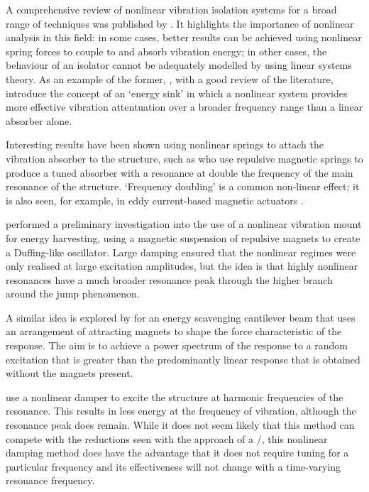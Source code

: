 \documentclass[11pt,a4paper]{memoir}
\begin{document}
A comprehensive review of nonlinear vibration isolation systems for a broad range of techniques was published by \textcite{ibrahim2008}.
It highlights the importance of nonlinear analysis in this field: in some cases, better results can be achieved using nonlinear spring forces to couple to and absorb vibration energy; in other cases, the behaviour of an isolator cannot be adequately modelled by using linear systems theory.
As an example of the former, \textcite{starosvetsky2008}, with a good review of the literature, introduce the concept of an `energy sink' in which a nonlinear system provides more effective vibration attentuation over a broader frequency range than a linear absorber alone.

Interesting results have been shown using nonlinear springs to attach the vibration absorber to the structure, such as \textcite{jo2008} who use repulsive magnetic springs to produce a tuned absorber with a resonance at double the frequency of the main resonance of the structure.
`Frequency doubling' is a common non-linear effect; it is also seen, for example, in eddy current-based magnetic actuators \cite{sodano2008-dsmc}.

\textcite{mann2008} performed a preliminary investigation into the use of a nonlinear vibration mount for energy harvesting, using a magnetic suspension of repulsive magnets to create a Duffing-like oscillator.
Large damping ensured that the nonlinear regimes were only realised at large excitation amplitudes, but the idea is that highly nonlinear resonances have a much broader resonance peak through the higher branch around the jump phenomenon.

A similar idea is explored by \textcite{shahruz2008} for an energy scavenging cantilever beam that uses an arrangement of attracting magnets to shape the force characteristic of the response.
The aim is to achieve a power spectrum of the response to a random excitation that is greater than the predominantly linear response that is obtained without the magnets present.

\textcite{zhang2008} use a nonlinear damper to excite the structure at harmonic frequencies of the resonance.
This results in less energy at the frequency of vibration, although the resonance peak does remain.
While it does not seem likely that this method can compete with the reductions seen with the approach of a \vibneut/, this nonlinear damping method does have the advantage that it does not require tuning for a particular frequency and its effectiveness will not change with a time-varying resonance frequency.
\end{document}
